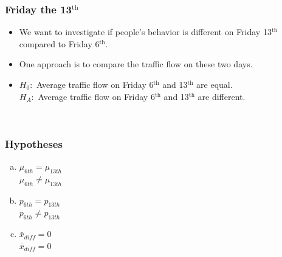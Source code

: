 
\begin{frame}
\frametitle{Friday the 13$^{\text{th}}$}

\begin{itemize}

\item We want to investigate if people's behavior is different on Friday 13$^{\text{th}}$ compared to Friday 6$^{\text{th}}$.

\pause

\item One approach is to compare the traffic flow on these two days.

\pause

\item $H_0:$ Average traffic flow on Friday 6$^{\text{th}}$ and 13$^{\text{th}}$ are equal. \\
$H_A:$ Average traffic flow on Friday 6$^{\text{th}}$ and 13$^{\text{th}}$ are different.

\pause

\end{itemize}

$\:$ \\



\end{frame}


\begin{frame}
\frametitle{Hypotheses}


\begin{enumerate}[(a)]
\item  {} $\mu_{6th} = \mu_{13th}$ \\
 $\mu_{6th} \ne \mu_{13th}$
\item  {} $p_{6th} = p_{13th}$ \\
 $p_{6th} \ne p_{13th}$
\item  {} $\bar{x}_{diff} = 0$ \\
 $\bar{x}_{diff} = 0$
\end{enumerate}

\end{frame}

